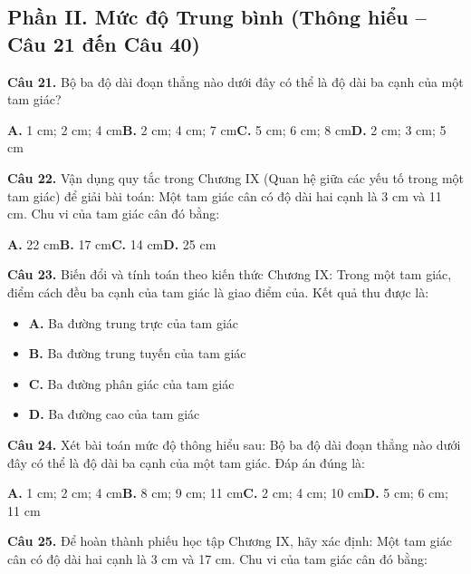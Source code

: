 \documentclass[11pt,a4paper]{article}
\begin{document}
\subsection*{\color{accent} Phần II. Mức độ Trung bình (Thông hiểu -- Câu 21 đến Câu 40)}
\textbf{\color{primary} Câu 21.} Bộ ba độ dài đoạn thẳng nào dưới đây có thể là độ dài ba cạnh của một tam giác?\par
\hspace*{1.5em}\textbf{A.} 1 cm; 2 cm; 4 cm\quad\quad \textbf{B.} 2 cm; 4 cm; 7 cm\quad\quad \textbf{C.} 5 cm; 6 cm; 8 cm\quad\quad \textbf{D.} 2 cm; 3 cm; 5 cm\par\vspace{2pt}
\textbf{\color{primary} Câu 22.} Vận dụng quy tắc trong Chương IX (Quan hệ giữa các yếu tố trong một tam giác) để giải bài toán: Một tam giác cân có độ dài hai cạnh là 3 cm và 11 cm. Chu vi của tam giác cân đó bằng:\par
\hspace*{1.5em}\textbf{A.} 22 cm\quad\quad \textbf{B.} 17 cm\quad\quad \textbf{C.} 14 cm\quad\quad \textbf{D.} 25 cm\par\vspace{2pt}
\textbf{\color{primary} Câu 23.} Biến đổi và tính toán theo kiến thức Chương IX: Trong một tam giác, điểm cách đều ba cạnh của tam giác là giao điểm của. Kết quả thu được là:\par
\begin{itemize}\setlength{\itemsep}{1pt}\setlength{\parskip}{0pt}
  \item[] \textbf{A.} Ba đường trung trực của tam giác
  \item[] \textbf{B.} Ba đường trung tuyến của tam giác
  \item[] \textbf{C.} Ba đường phân giác của tam giác
  \item[] \textbf{D.} Ba đường cao của tam giác
\end{itemize}\vspace{2pt}
\textbf{\color{primary} Câu 24.} Xét bài toán mức độ thông hiểu sau: Bộ ba độ dài đoạn thẳng nào dưới đây có thể là độ dài ba cạnh của một tam giác. Đáp án đúng là:\par
\hspace*{1.5em}\textbf{A.} 1 cm; 2 cm; 4 cm\quad\quad \textbf{B.} 8 cm; 9 cm; 11 cm\quad\quad \textbf{C.} 2 cm; 4 cm; 10 cm\quad\quad \textbf{D.} 5 cm; 6 cm; 11 cm\par\vspace{2pt}
\textbf{\color{primary} Câu 25.} Để hoàn thành phiếu học tập Chương IX, hãy xác định: Một tam giác cân có độ dài hai cạnh là 3 cm và 17 cm. Chu vi của tam giác cân đó bằng:\par
\end{document}
